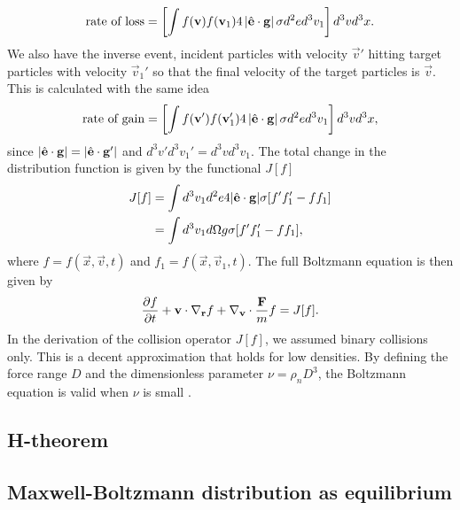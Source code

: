 \begin{align}
	\text{rate of loss} = \left[\int f(\mathbf v)f(\mathbf v_1)4\left|\hat {\mathbf{e}} \cdot \mathbf g \right|\sigma d^2 ed^3 v_1\right]d^3 vd^3 x.
\end{align}
We also have the inverse event, incident particles with velocity $\vec v'$ hitting target particles with velocity $\vec v_1'$ so that the final velocity of the target particles is $\vec v$. This is calculated with the same idea
\begin{align}
	\text{rate of gain} = \left[\int f(\mathbf v')f(\mathbf v_1')4\left|\hat {\mathbf{e}} \cdot \mathbf g \right|\sigma d^2 ed^3 v_1\right]d^3 vd^3 x,
\end{align}
since $|\hat {\mathbf{e}}\cdot \mathbf g| = |\hat {\mathbf{e}}\cdot \mathbf g'|$ and $d^3 v'd^3 v_1' = d^3 vd^3 v_1$. The total change in the distribution function is given by the functional $J[f]$
\begin{align}
	J[f] &= \int d^3 v_1 d^2 e4|\hat {\mathbf{e}}\cdot\mathbf g|\sigma[f'f_1' - ff_1]\\
	&= \int d^3 v_1 d\Omega g \sigma[f'f_1' - ff_1],
\end{align}
where $f = f(\vec x, \vec v, t)$ and $f_1 = f(\vec x, \vec v_1, t)$. The full Boltzmann equation is then given by
\begin{align}
	\label{eq:boltzmann_equation}
	\frac{\partial f}{\partial t} + \mathbf v\cdot \nabla_\mathbf r f + \nabla_\mathbf v\cdot{\mathbf F\over m} f = J[f].
\end{align}
In the derivation of the collision operator $J[f]$, we assumed binary collisions only. This is a decent approximation that holds for low densities. By defining the force range $D$ and the dimensionless parameter $\nu = \rho_n D^3$, the Boltzmann equation is valid when $\nu$ is small \cite{mclennan1989introduction}. 
\subsection{H-theorem}
\subsection{Maxwell-Boltzmann distribution as equilibrium}
